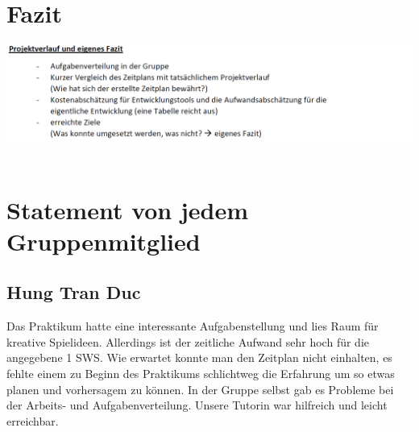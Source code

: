 \documentclass[a4paper, 11pt]{article} %
\begin{document}
\section{Fazit}
\includegraphics[scale=0.5]{images/projektverlauf.png}\\\\

\section{Statement von jedem Gruppenmitglied}
\subsection{Hung Tran Duc}
Das Praktikum hatte eine interessante Aufgabenstellung und lies Raum für kreative Spielideen.
Allerdings ist der zeitliche Aufwand sehr hoch für die angegebene 1 SWS.
Wie erwartet konnte man den Zeitplan nicht einhalten, es fehlte einem zu Beginn des Praktikums schlichtweg 
die Erfahrung um so etwas planen und vorhersagem zu können.
In der Gruppe selbst gab es Probleme bei der Arbeits- und Aufgabenverteilung.
Unsere Tutorin war hilfreich und leicht erreichbar.
\end{document}
